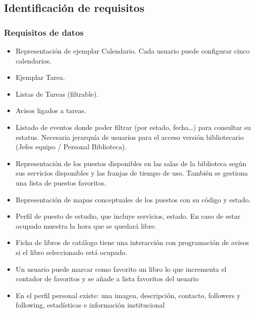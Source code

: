 \documentclass[12pt]{article}
\begin{document}
\subsection{Identificación de requisitos}

\subsubsection{Requisitos de datos}
\begin{itemize}[noitemsep] 
\item Representación de ejemplar Calendario. Cada usuario puede configurar cinco calendarios. 
\item Ejemplar Tarea.
\item Listas de Tareas (filtrable).
\item Avisos ligados a tareas.
\item Listado de eventos donde poder filtrar (por estado, fecha…) para consultar su estatus. Necesaria jerarquía de usuarios para el acceso versión bibliotecario (Jefes equipo / Personal Biblioteca).
\item Representación de los puestos disponibles en las salas de la biblioteca según sus servicios disponibles y las franjas de tiempo de uso. También se gestiona una lista de puestos favoritos.
\item Representación de mapas conceptuales de los puestos con su código y estado.
\item Perfil de puesto de estudio, que incluye servicios, estado. En caso de estar ocupado muestra la hora que se quedará libre.
\item Ficha de libros de catálogo tiene una interacción con programación de avisos si el libro seleccionado está ocupado. 
\item Un usuario puede marcar como favorito un libro lo que incrementa el contador de favoritos y se añade a lista favoritos del usuario
\item En el perfil personal existe: una imagen, descripción, contacto, followers y following, estadísticas e información institucional
\end{itemize}
\end{document}
